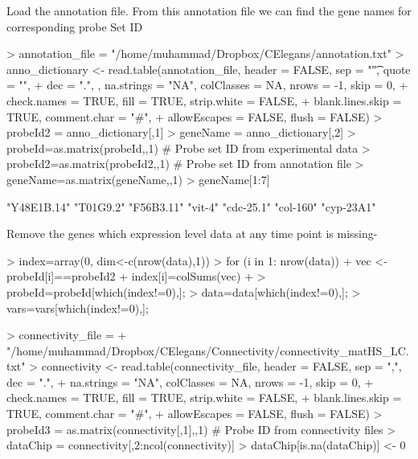 \documentclass{article}
\begin{document}
Load the annotation file. From this annotation file we can find the gene names for corresponding probe Set ID
\begin{Schunk}
\begin{Sinput}
> annotation_file = "/home/muhammad/Dropbox/CElegans/annotation.txt"
> anno_dictionary <- read.table(annotation_file, header = FALSE, sep = "\t", quote = "", 
+                   dec = ".", , na.strings = "NA", colClasses = NA, nrows = -1, skip = 0, 
+                   check.names = TRUE, fill = TRUE, strip.white = FALSE, 
+                   blank.lines.skip = TRUE, comment.char = "#", 
+                   allowEscapes = FALSE, flush = FALSE)
> probeId2 = anno_dictionary[,1]
> geneName = anno_dictionary[,2]
> probeId=as.matrix(probeId,,1) # Probe set ID from experimental data
> probeId2=as.matrix(probeId2,,1) # Probe set ID from annotation file
> geneName=as.matrix(geneName,,1)
> geneName[1:7]
\end{Sinput}
\begin{Soutput}
[1] "Y48E1B.14" "T01G9.2"   "F56B3.11"  "vit-4"     "cdc-25.1"  "col-160"   "cyp-23A1" 
\end{Soutput}
\end{Schunk}

Remove the genes which expression level data at any time point is missing-

\begin{Schunk}
\begin{Sinput}
> index=array(0, dim<-c(nrow(data),1))
> for (i in 1: nrow(data)){
+   vec <- probeId[i]==probeId2
+ 	index[i]=colSums(vec)
+ }
> probeId=probeId[which(index!=0),];
> data=data[which(index!=0),];
> vars=vars[which(index!=0),];
\end{Sinput}
\end{Schunk}


\begin{Schunk}
\begin{Sinput}
> connectivity_file = 
+   "/home/muhammad/Dropbox/CElegans/Connectivity/connectivity_matHS_LC.txt"
> connectivity <- read.table(connectivity_file, header = FALSE, sep = ",", dec = ".", 
+                 na.strings = "NA", colClasses = NA, nrows = -1, skip = 0, 
+                 check.names = TRUE, fill = TRUE, strip.white = FALSE,  
+                 blank.lines.skip = TRUE, comment.char = "#", 
+                 allowEscapes = FALSE, flush = FALSE)
> probeId3 = as.matrix(connectivity[,1],,1) # Probe ID from connectivity files
> dataChip = connectivity[,2:ncol(connectivity)]
> dataChip[is.na(dataChip)] <- 0
\end{Sinput}
\end{Schunk}
\end{document}
